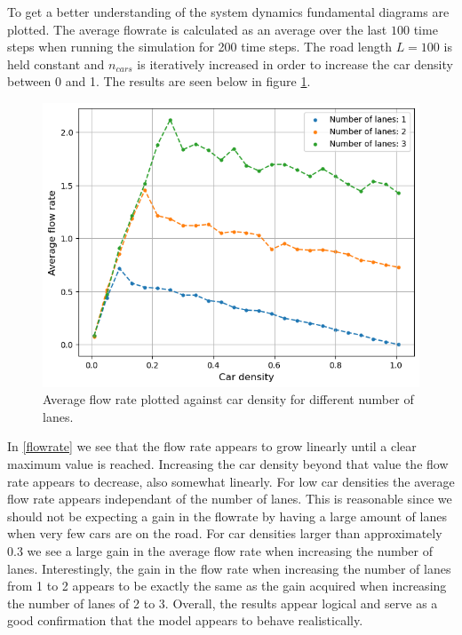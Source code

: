 \documentclass[a4paper,12pt]{article}
\begin{document}
To get a better understanding of the system dynamics fundamental diagrams are plotted. The average flowrate is calculated as an average over the last $100$ time steps when running
the simulation for 200 time steps. The road length $L=100$ is held constant and $n_{cars}$ is iteratively
increased in order to increase the car density between 0 and 1. The results are seen below in figure \ref*{fundamental diagram}.

\begin{figure}[H]
    \centering
    \includegraphics[scale=0.9]{Images/fundamental diagram 120.png}
    \caption{Average flow rate plotted against car density for different number of lanes.}
    \label{fundamental diagram}
\end{figure}

In \ref*{flowrate} we see that the flow rate appears to grow linearly until a clear maximum value is reached. Increasing the car density beyond
that value the flow rate appears to decrease, also somewhat linearly. For low car densities the average flow rate appears independant of the number of lanes.
This is reasonable since we should not be expecting a gain in the flowrate by having a large amount of lanes when very few cars are on the road.
For car densities larger than approximately 0.3 we see a large gain in the average flow rate when increasing the number of lanes. Interestingly, the gain in the
flow rate when increasing the number of lanes from 1 to 2 appears to be exactly the same as the gain acquired when increasing the number of lanes of 2 to 3.
Overall, the results appear logical and serve as a good confirmation that the model appears to behave realistically.
\end{document}
